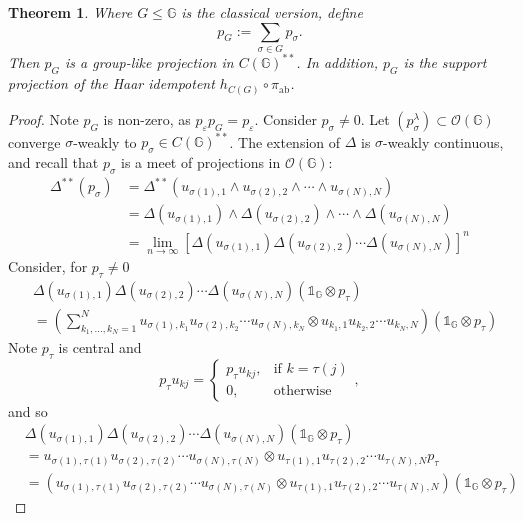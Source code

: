 \documentclass[12pt]{amsart}
\newtheorem{theorem}{Theorem}[section]
\theoremstyle{remark}
\theoremstyle{remark}
\begin{document}
\begin{theorem}\label{glp}
Where $G\leq \mathbb{G}$ is the classical version, define
$$p_G:=\sum_{\sigma\in G}p_{\sigma}.$$
Then $p_{G}$ is a group-like projection in $C(\mathbb{G})^{**}$. In addition, $p_G$ is the support projection of the Haar idempotent $h_{C(G)}\circ \pi_{\text{ab}}$.
\end{theorem}
\begin{proof}
Note $p_G$ is non-zero, as $p_{\varepsilon}p_G=p_{\varepsilon}$.
 Consider $p_{\sigma}\neq 0$. Let $(p^{\lambda}_\sigma)\subset \mathcal{O}(\mathbb{G})$  converge $\sigma$-weakly to $p_{\sigma}\in C(\mathbb{G})^{**}$. The extension of $\Delta$ is $\sigma$-weakly continuous, and recall that $p_\sigma$ is a meet of projections in $\mathcal{O}(\mathbb{G})$:
\begin{align*}
  \Delta^{**}(p_\sigma) & =\Delta^{**}(u_{\sigma(1),1}\wedge u_{\sigma(2),2}\wedge\cdots\wedge u_{\sigma(N),N}) \\
   & =\Delta(u_{\sigma(1),1})\wedge \Delta(u_{\sigma(2),2})\wedge\cdots\wedge\Delta(u_{\sigma(N),N}) \\
   & =\lim_{n\to \infty}\left[\Delta(u_{\sigma(1),1}) \Delta(u_{\sigma(2),2})\cdots\Delta(u_{\sigma(N),N})\right]^n
\end{align*}
Consider, for $p_\tau\neq 0$
\begin{align*}
&  \Delta(u_{\sigma(1),1}) \Delta(u_{\sigma(2),2})\cdots\Delta(u_{\sigma(N),N})(\mathds{1}_{\mathbb{G}}\otimes p_\tau) \\&=\left(\sum_{k_1,\dots,k_N=1}^Nu_{\sigma(1),k_1}u_{\sigma(2),k_2}\cdots u_{\sigma(N),k_N}\otimes u_{k_1,1}u_{k_2,2}\cdots u_{k_N,N}\right)(\mathds{1}_{\mathbb{G}}\otimes p_\tau)
\end{align*}
Note $p_\tau$ is central and
$$p_\tau u_{kj}=\begin{cases}
                  p_\tau u_{kj}, & \mbox{if } k=\tau(j) \\
                  0, & \mbox{otherwise}
                \end{cases},$$
                and so
                \begin{align*}
                &\Delta(u_{\sigma(1),1}) \Delta(u_{\sigma(2),2})\cdots\Delta(u_{\sigma(N),N})(\mathds{1}_{\mathbb{G}}\otimes p_\tau)
                \\&=u_{\sigma(1),\tau(1)}u_{\sigma(2),\tau(2)}\cdots u_{\sigma(N),\tau(N)}\otimes u_{\tau(1),1}u_{\tau(2),2}\cdots u_{\tau(N),N}p_{\tau}
                \\&=(u_{\sigma(1),\tau(1)}u_{\sigma(2),\tau(2)}\cdots u_{\sigma(N),\tau(N)}\otimes u_{\tau(1),1}u_{\tau(2),2}\cdots u_{\tau(N),N})(\mathds{1}_{\mathbb{G}}\otimes p_{\tau})

\end{align*}
\end{proof}
\end{document}
